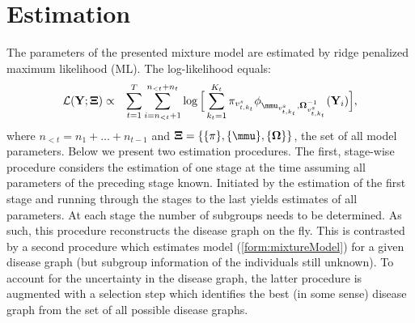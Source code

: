 \documentclass[10pt]{article}
\begin{document}
\section{Estimation}
The parameters of the presented mixture model are estimated by ridge penalized maximum likelihood (ML). The log-likelihood equals:
\begin{eqnarray} \label{form:mixtureLikelihood}
\mathcal{L}(\mathbf{Y}; \mathbf{\Xi}) & \propto & \sum_{t=1}^T \sum_{i=n_{<t} + 1}^{n_{<t} + n_t} \log \Big[ \sum_{k_t=1}^{K_t}  \pi_{v_{t, k_t}^s} \phi_{\mmu_{v_{t, k_t}^s}, \mathbf{\Omega}_{v_{t, k_t}^s}^{-1}} (\mathbf{Y}_i) \Big],
\end{eqnarray}
where $n_{<t} = n_1 + \ldots + n_{t-1}$ and $\mathbf{\Xi} = \{ \{ \pi \}, \{ \mmu \}, \{ \mathbf{\Omega} \} \}$, the set of all model parameters. Below we present two estimation procedures. The first, stage-wise procedure considers the estimation of one stage at the time assuming all parameters of the preceding stage known. Initiated by the estimation of the first stage and running through the stages to the last yields estimates of all parameters. At each stage the number of subgroups needs to be determined. As such, this procedure reconstructs the disease graph on the fly. This is contrasted by a second procedure which estimates model (\ref{form:mixtureModel}) for a given disease graph (but subgroup information of the individuals still unknown). To account for the uncertainty in the disease graph, the latter procedure is augmented with a selection step which identifies the best (in some sense) disease graph from the set of all possible disease graphs.

\end{document}
